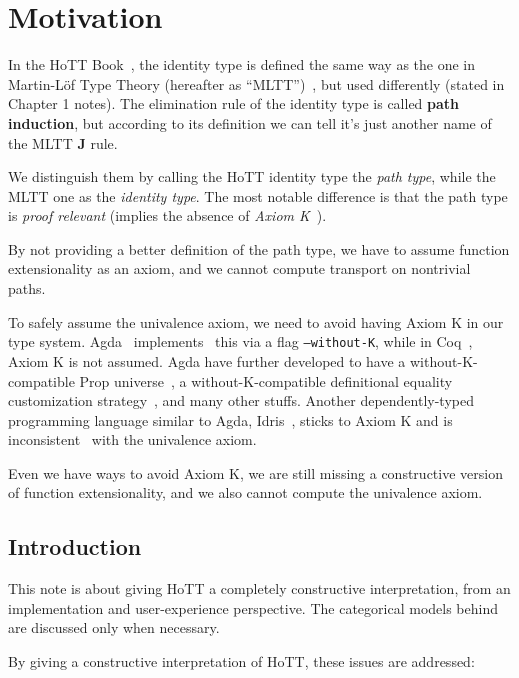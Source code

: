 \section{Motivation}
\label{sec:motivation}

In the HoTT Book~\cite{hottbook},
the identity type is defined the same way as the one
in Martin-L\"{o}f Type Theory (hereafter as ``MLTT'')~\cite{MLTT},
but used differently (stated in Chapter 1 notes).
The elimination rule of the identity type is called \textbf{path induction},
but according to its definition we can tell
it's just another name of the MLTT \textbf J rule.

We distinguish them by calling the HoTT identity type the \textit{path type},
while the MLTT one as the \textit{identity type}.
The most notable difference is that the path type is
\textit{proof relevant} (implies the absence of
\textit{Axiom K}~\cite{AxiomK}).

By not providing a better definition of the path type,
we have to assume function extensionality as an axiom,
and we cannot compute transport on nontrivial paths.

To safely assume the univalence axiom, we need to avoid having Axiom K
in our type system.
Agda~\cite{Agda} implements~\cite{WithoutK} this via a flag \texttt{--without-K},
while in Coq~\cite{Coq}, Axiom K is not assumed.
Agda have further developed to have a without-K-compatible \textsf{Prop}
universe~\cite{PropWithoutK}, a without-K-compatible definitional equality
customization strategy~\cite{RewriteWithoutK}, and many other stuffs.
Another dependently-typed programming language similar to Agda,
Idris~\cite{Idris}, sticks to Axiom K and is
inconsistent~\cite{IdrisHoTT} with the univalence axiom.

Even we have ways to avoid Axiom K,
we are still missing a constructive version of function extensionality,
and we also cannot compute the univalence axiom.

\subsection{Introduction}
\label{subsec:introduction}

This note is about giving HoTT a completely constructive interpretation,
from an implementation and user-experience perspective.
The categorical models behind are discussed only when necessary.

By giving a constructive interpretation of HoTT,
these issues are addressed:

